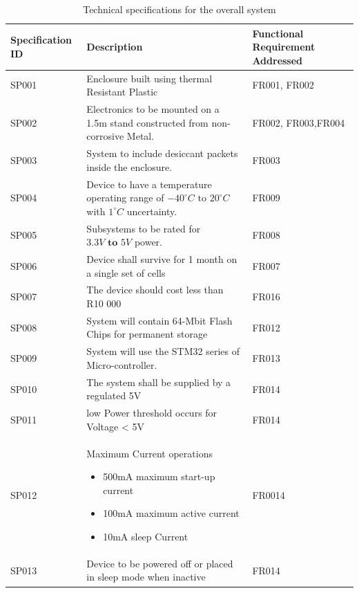 \begin{table}[H]
    \centering
    \caption{Technical specifications for the overall system}
    \begin{tabular}{|m{}|m{} | m{} |}
        \hline
         Specification ID & Description & Functional Requirement Addressed \\
         \hline
         SP001 & Enclosure built using thermal Resistant Plastic & FR001, FR002\\
         \hline
         SP002 & Electronics to be mounted on a 1.5m stand constructed from non-corrosive Metal. & FR002, FR003,FR004\\
         \hline
         SP003 & System to include desiccant packets inside the enclosure. & FR003 \\
         \hline
         SP004 & Device to have a temperature operating range of $-40 ^\circ C \text{ to } 20 ^\circ C $ with $ 1^\circ C $ uncertainty. & FR009 \\
          \hline
         SP005 & Subsystems to be rated for $3.3V \textbf{ to } 5V$ power. & FR008 \\
          \hline
         SP006 & Device shall survive for 1 month on a single set of cells & FR007 \\
          \hline
         SP007 & The device should cost less than R10 000 & FR016 \\
         \hline
         SP008 & System will contain 64-Mbit Flash Chips for permanent storage & FR012 \\
         \hline
         SP009 & System will use the STM32 series of Micro-controller. & FR013 \\
         \hline 
         SP010 & The system shall be supplied by a regulated 5V & FR014 \\
         \hline
         SP011 & low Power threshold occurs for Voltage < 5V & FR014 \\
         \hline 
         SP012 & Maximum Current operations
         \begin{itemize}
             \item 500mA maximum start-up current
             \item 100mA maximum active current
             \item 10mA sleep Current
         \end{itemize} & FR0014 \\
         \hline
         SP013 & Device to be powered off or placed in sleep mode when inactive & FR014 \\
         \hline
    \end{tabular}

    \label{tab:sys_specs}
\end{table}
